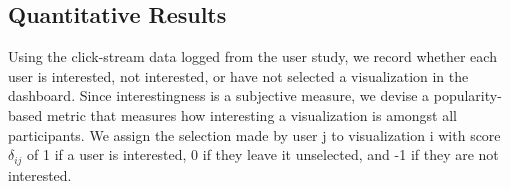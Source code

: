 \subsection{Quantitative Results}
 Using the click-stream data logged from the user study, we record whether each user is interested, not interested, or have not selected a visualization in the dashboard. %
Since interestingness is a subjective measure, 
we devise a popularity-based metric that measures how interesting a visualization is amongst all participants. We assign the selection made by user j to visualization i with score $\delta_{ij}$ of 1 if a user is interested, 0 if they leave it unselected, and -1 if they are not interested. 

